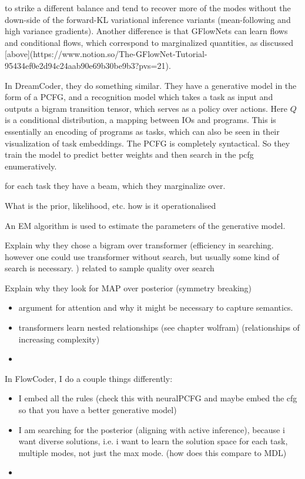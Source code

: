 to strike a different balance and tend to recover more of the modes without the down-side of the forward-KL variational inference variants (mean-following and high variance gradients). Another difference is that GFlowNets can learn flows and conditional flows, which correspond to marginalized quantities, as discussed [above](https://www.notion.so/The-GFlowNet-Tutorial-95434ef0e2d94c24aab90e69b30be9b3?pvs=21).




In DreamCoder, they do something similar. They have a generative model in the form of a PCFG, and a recognition model which takes a task as input and outputs a bigram transition tensor, which serves as a policy over actions. Here $Q$ is a conditional distribution, a mapping between IOs and programs. This is essentially an encoding of programs as tasks, which can also be seen in their visualization of task embeddings.
The PCFG is completely syntactical.
So they train the model to predict better weights and then search in the pcfg enumeratively. 

for each task they have a beam, which they marginalize over. 

What is the prior, likelihood, etc. how is it operationalised

An EM algorithm is used to estimate the parameters of the generative model. 

Explain why they chose a bigram over transformer (efficiency in searching. however one could use transformer without search, but usually some kind of search is necessary. ) related to sample quality over search

Explain why they look for MAP over posterior (symmetry breaking)

\begin{itemize}
    \item argument for attention and why it might be necessary to capture semantics.
    \item transformers learn nested relationships (see chapter wolfram) (relationships of increasing complexity)
    \item 
\end{itemize}

In FlowCoder, I do a couple things differently:

\begin{itemize}
    \item I embed all the rules (check this with neuralPCFG and maybe embed the cfg so that you have a better generative model)
    \item I am searching for the posterior (aligning with active inference), because i want diverse solutions, i.e. i want to learn the solution space for each task, multiple modes, not just the max mode. (how does this compare to MDL)
    \item 
\end{itemize}

